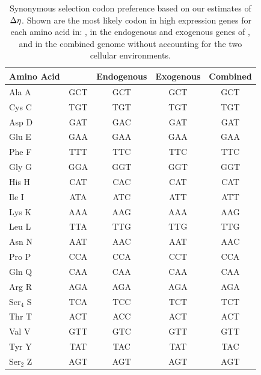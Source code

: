 \documentclass[fleqn,letterpaper]{article}
\begin{document}
\clearpage

\begin{table}
    \centering
    \caption{Synonymous selection codon preference based on our estimates of ${\Delta \eta}$.
	 Shown are the most likely codon in high expression genes for each amino acid in: \gossypii, in the endogenous and exogenous genes of \kluyveri, and in the combined \kluyveri genome without accounting for the two cellular environments.}
\begin{tabular}{  l  c  c  c  c  }
\hline
	Amino Acid & \gossypii & Endogenous & Exogenous & Combined \\ \hline
	Ala A & GCT & GCT & GCT & GCT \\ 
	Cys C & TGT & TGT & TGT & TGT \\ 
	Asp D & GAT & GAC & GAT & GAT \\ 
	Glu E & GAA & GAA & GAA & GAA \\ 
	Phe F & TTT & TTC & TTC & TTC \\ 
	Gly G & GGA & GGT & GGT & GGT \\ 
	His H & CAT & CAC & CAT & CAT \\ 
	Ile I & ATA & ATC & ATT & ATT \\ 
	Lys K & AAA & AAG & AAA & AAG \\ 
	Leu L & TTA & TTG & TTG & TTG \\ 
	Asn N & AAT & AAC & AAT & AAC \\ 
	Pro P & CCA & CCA & CCT & CCA \\ 
	Gln Q & CAA & CAA & CAA & CAA \\ 
	Arg R & AGA & AGA & AGA & AGA \\ 
	Ser$_4$ S & TCA & TCC & TCT & TCT \\ 
	Thr T & ACT & ACC & ACT & ACT \\ 
	Val V & GTT & GTC & GTT & GTT \\ 
	Tyr Y & TAT & TAC & TAT & TAC \\ 
	Ser$_2$ Z & AGT & AGT & AGT & AGT \\ \hline
\end{tabular}
    \label{tab:codon_pref_deta}
\end{table}
\clearpage
\end{document}
